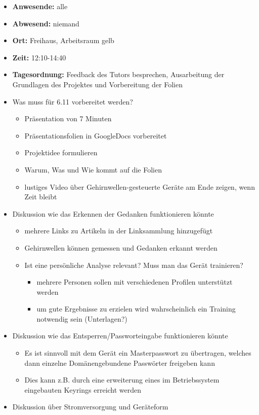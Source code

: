 \begin{itemize}
\item
  \textbf{Anwesende:} alle
\item
  \textbf{Abwesend:} niemand
\item
  \textbf{Ort:} Freihaus, Arbeitsraum gelb
\item
  \textbf{Zeit:} 12:10-14:40
\item
  \textbf{Tagesordnung:} Feedback des Tutors besprechen, Ausarbeitung
  der Grundlagen des Projektes und Vorbereitung der Folien
\item
  Was muss für 6.11 vorbereitet werden?

  \begin{itemize}
  \itemsep1pt\parskip0pt
  \item
    Präsentation von 7 Minuten
  \item
    Präsentationsfolien in GoogleDocs vorbereitet
  \item
    Projektidee formulieren
  \item
    Warum, Was und Wie kommt auf die Folien
  \item
    lustiges Video über Gehirnwellen-gesteuerte Geräte am Ende zeigen,
    wenn Zeit bleibt
  \end{itemize}
\item
  Diskussion wie das Erkennen der Gedanken funktionieren könnte

  \begin{itemize}
  \itemsep1pt\parskip0pt
  \item
    mehrere Links zu Artikeln in der Linksammlung hinzugefügt
  \item
    Gehirnwellen können gemessen und Gedanken erkannt werden
  \item
    Ist eine persönliche Analyse relevant? Muss man das Gerät
    trainieren?

    \begin{itemize}
    \itemsep1pt\parskip0pt
    \item
      mehrere Personen sollen mit verschiedenen Profilen unterstützt
      werden
    \item
      um gute Ergebnisse zu erzielen wird wahrscheinlich ein Training
      notwendig sein (Unterlagen?)
    \end{itemize}
  \end{itemize}
\item
  Diskussion wie das Entsperren/Passworteingabe funktionieren könnte

  \begin{itemize}
  \itemsep1pt\parskip0pt
  \item
    Es ist sinnvoll mit dem Gerät ein Masterpasswort zu übertragen,
    welches dann einzelne Domänengebundene Passwörter freigeben kann
  \item
    Dies kann z.B. durch eine erweiterung eines im Betriebssystem
    eingebauten Keyrings erreicht werden
  \end{itemize}
\item
  Diskussion über Stromversorgung und Geräteform


\end{itemize}

